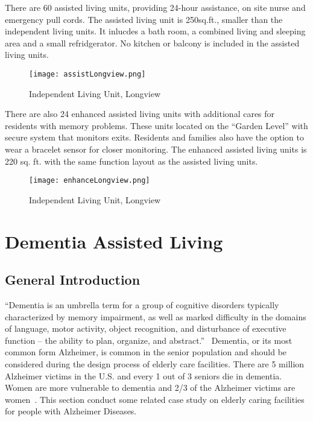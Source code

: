 There are 60 assisted living units, providing 24-hour assistance, on 
site nurse and emergency pull cords. The assisted living unit is
250sq.ft., smaller than the independent living units. It inlucdes a
bath room, a combined living and sleeping area and a
small refridgerator. No kitchen or balcony is included in the assisted
living units.
\begin{figure}[htbp]
  \centering
  \texttt{[image: assistLongview.png]}
  \caption[Independent Living Unit, Longview]{Independent Living
    Unit, Longview~\cite{LongviewAssist}}
  \label{fig:assistLongview}
\end{figure}
There are also 24 enhanced assisted living units with additional cares
for residents with memory problems. These units located on the
``Garden Level'' with secure system that monitors exits. Residents
and families also have the option to wear a bracelet sensor for closer
monitoring. The enhanced assisted living units is 220 sq. ft. with the
same function layout as the assisted living units.
\begin{figure}[htbp]
  \centering
  \texttt{[image: enhanceLongview.png]}
  \caption[Independent Living Unit, Longview]{Independent Living
    Unit, Longview~\cite{enhanceLongview}}
  \label{fig:enhanceLongview}
\end{figure}
\section{Dementia Assisted Living}
\subsection{General Introduction}
``Dementia is an umbrella term for a group of cognitive disorders
typically characterized by memory impairment, as well as marked
difficulty in the domains of language, motor activity, object
recognition, and disturbance of executive function – the ability to
plan, organize, and abstract.''~\cite{CDCdementia} Dementia, or its
most common form Alzheimer, is common in the senior population and
should be considered during the design process of elderly care
facilities. There are 5 million Alzheimer victims in the U.S. and
every 1 out of 3 seniors die in dementia. Women are more vulnerable to
dementia and 2/3 of the Alzheimer victims are
women~\cite{alzorg2014}. This section conduct some related case study
on elderly caring facilities for people with Alzheimer Diseases.

